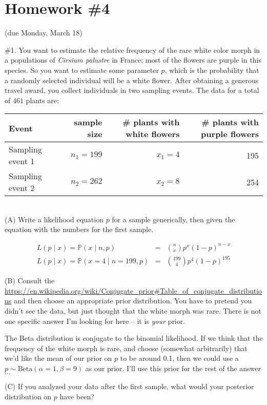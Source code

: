 \documentclass[11pt]{article}
\renewcommand{\Pr}{\mathbb{P}}
\newcommand{\answer}[1]{{\color{red}#1}}
\begin{document}
\section*{Homework \#4} (due Monday, March 18)

\#1. You want to estimate the relative frequency of the rare white color morph 
in a populations of {\em Cirsium palustre} in France; most of the flowers are purple in this
species.
So you want to estimate some parameter $p$, which is the probability that a randomly selected
individual will be a white flower.
After obtaining a generous travel award, you collect individuals in two sampling events.
The data for a total of $461$ plants are:\\
\begin{tabular}{|l|r|r|r|}
\hline
Event & sample size & \# plants with white flowers & \# plants with purple flowers \\
\hline
 Sampling event 1 & $n_1 = 199$ & $x_1=4$ & 195 \\
Sampling event 2  & $n_2 = 262$ &$x_2=8$ & 254 \\
\hline
\end{tabular}\\

(A) Write a likelihood equation $p$ for a sample generically, then given the equation with the numbers for the first sample.

\answer{
\begin{eqnarray}
L(p\mid x) = \Pr(x \mid n, p) & = & {n\choose x} p^x(1-p)^{n-x}\\
L(p\mid x) =\Pr(x=4 \mid n=199, p) & = & {199\choose 4} p^4(1-p)^{195}
\end{eqnarray}
}

(B) Consult the \url{https://en.wikipedia.org/wiki/Conjugate_prior#Table_of_conjugate_distributions} and then choose an appropriate prior distribution.
You have to pretend you didn't see the data, but just thought that the white morph was rare.
There is not one specific answer I'm looking for here -- it is {\em your} prior.

\answer{
The Beta distribution is conjugate to the binomial likelihood. If we think that
the frequency of the white morph is rare, and choose (somewhat arbitrarily)
that we'd like the mean of our prior on $p$ to be around 0.1, then we could use 
a $p\sim\mbox{Beta}(\alpha=1, \beta=9)$ as our prior.
I'll use this prior for the rest of the answer$\ldots$
}

(C) If you analyzed your data after the first sample, what would your posterior distribution
on $p$ have been?
\end{document}
